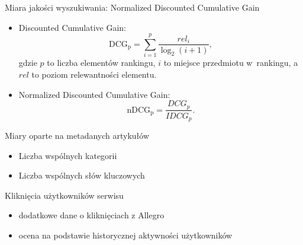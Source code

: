 \documentclass{beamer}
\begin{document}
	
	\begin{frame}{Miara jakości wyszukiwania: Normalized Discounted Cumulative Gain}
		\begin{itemize}
			\item Discounted Cumulative Gain:
			\begin{equation}
			\label{eq:dcg}
			{\mathrm  {DCG_{{p}}}}=\sum _{{i=1}}^{{p}}{\frac  {rel_{i}}{\log _{{2}}(i+1)}},
			\end{equation}
			gdzie $p$ to liczba elementów rankingu, $i$ to miejsce przedmiotu w~rankingu, a $rel$ to poziom relewantności elementu.
			

			\item Normalized Discounted Cumulative Gain:
			\begin{equation}
			\label{eq:ndcg}
			{\mathrm  {nDCG_{{p}}}}={\frac  {DCG_{{p}}}{IDCG_{{p}}}}.
			\end{equation}
		\end{itemize}
	\end{frame}
	\begin{frame}{Miary oparte na metadanych artykułów}
		\begin{itemize}
			\item Liczba wspólnych kategorii
					
			\item Liczba wspólnych słów kluczowych
		\end{itemize}
	\end{frame}
	\begin{frame}{Kliknięcia użytkowników serwisu}
		\begin{itemize}
			\item dodatkowe dane o kliknięciach z Allegro
			\item ocena na podstawie historycznej aktywności użytkowników
		\end{itemize}
	\end{frame}
\end{document}
